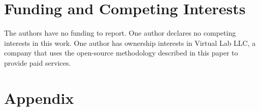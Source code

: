 \documentclass[letterpaper,12pt]{article}
\theoremstyle{proposition}
\begin{document}




\section*{\normalsize Funding and Competing Interests}
\normalsize The authors have no funding to report. One author declares no competing interests in this work. One author has ownership interests in Virtual Lab LLC, a company that uses the open-source methodology described in this paper to provide paid services.


% 


%
\singlespacing
\printbibliography


\clearpage
\newpage

\appendix
\doublespacing


\label{appendix:A}
\setcounter{figure}{0}
\renewcommand{\thefigure}{A\arabic{figure}}
\renewcommand{\theHfigure}{A\arabic{figure}} %

\renewcommand{\thetable}{A\arabic{table}}
\renewcommand{\theHtable}{A\arabic{table}} %


\section*{Appendix}
\end{document}
